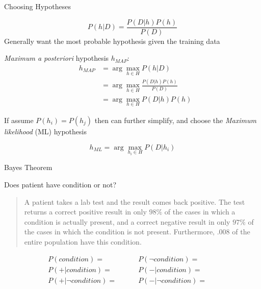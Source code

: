\documentclass[%
pdf,
colorBG,
slideColor,
tcrico,
]{prosper}
\begin{document}
\begin{slide}{ Choosing Hypotheses}
\tiny 

\[ P(h|D) = \frac{P(D|h) P(h)}{P(D)} \]
Generally want the most probable hypothesis given the training data

{\em Maximum a posteriori} hypothesis $h_{MAP}$:
\begin{eqnarray}
& h_{MAP} & = \arg \max_{h \in H} P(h|D)\nonumber \\
& & = \arg \max_{h \in H} \frac{P(D|h) P(h)}{P(D)} \nonumber \\
& & = \arg \max_{h \in H}P(D|h) P(h) \nonumber
\end{eqnarray}



If assume $P(h_{i})=P(h_{j})$ then can further simplify, and choose the 
{\em Maximum likelihood} (ML) hypothesis


\[h_{ML} = \arg \max_{h_{i} \in H} P(D|h_{i}) \]
\end{slide}


\begin{slide}{ Bayes Theorem   }  

Does patient have condition or not?
\begin{quote}
A patient takes a lab test and the result comes back positive.  The test
returns a correct positive result in only $98\%$ of the cases in which a
condition is actually present, and a correct negative result in only $97\%$ of
the cases in which the condition is not present.  Furthermore, $.008$ of the
entire population have this condition.
\end{quote}

\begin{eqnarray}
& P(condition) = \ \ \ \ \ \ \ \ \ \  & P(\neg condition) =  \ \ \ \ \ \ \ \ \ \ \nonumber \\
& P(+ | condition) =  \ \ \ \ \ \ \ \ \ \   & P(- | condition) =   \ \ \ \ \ \ \ \ \ \ \nonumber \\
& P(+ | \neg condition) =   \ \ \ \ \ \ \ \ \ \  & P(- | \neg condition) =  \ \ \ \ \ \ \ \ \ \ \nonumber 
\end{eqnarray}
\end{slide}

\end{document}
